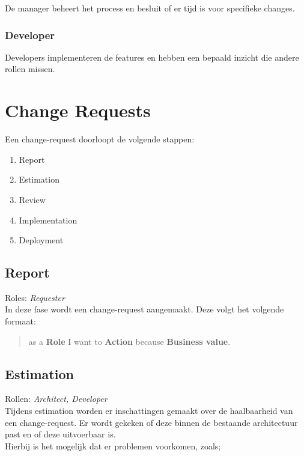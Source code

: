 \documentclass[]{scrreprt}
\begin{document}
	De manager beheert het process en besluit of er tijd is voor specifieke changes.
	
	\subsection{Developer}
	
	Developers implementeren de features en hebben een bepaald inzicht die andere rollen missen.
	
	\chapter{Change Requests}
	
	Een change-request doorloopt de volgende stappen:
	
	\begin{enumerate}
		\item Report
		\item Estimation
		\item Review
		\item Implementation
		\item Deployment
	\end{enumerate}

	\section{Report}
	
	Roles: \textit{Requester} \\
	
	In deze fase wordt een change-request aangemaakt. Deze volgt het volgende formaat: 
	
	\begin{quotation}
		as a \textbf{Role} I want to \textbf{Action} because \textbf{Business value}.
	\end{quotation}
	
	\section{Estimation}
	
	Rollen: \textit{Architect, Developer} \\
	
	Tijdens estimation worden er inschattingen gemaakt over de haalbaarheid van een change-request. Er wordt gekeken of deze binnen de bestaande architectuur past en of deze uitvoerbaar is. \\
	
	Hierbij is het mogelijk dat er problemen voorkomen, zoals;
	
\end{document}
